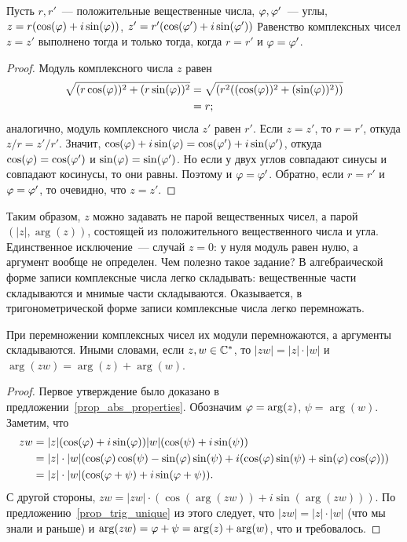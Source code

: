\begin{proposition}\label{prop_trig_unique}
Пусть $r,r'$~--- положительные вещественные числа, $\varphi,\varphi'$~---
углы, $z=r(\cos(\varphi)+i\sin(\varphi))$, $z'=r'(\cos(\varphi')+i\sin(\varphi'))$
Равенство комплексных чисел
$z=z'$ выполнено тогда и
только тогда, когда $r=r'$ и $\varphi=\varphi'$.
\end{proposition}
\begin{proof}
Модуль комплексного числа $z$ равен
\begin{align*}
\sqrt{(r\cos(\varphi))^2+(r\sin(\varphi))^2}&=\sqrt{(r^2((\cos(\varphi))^2+(\sin(\varphi))^2))}\\
&=r;
\end{align*}
аналогично, модуль комплексного числа $z'$ равен $r'$. Если $z=z'$, то
$r=r'$, откуда $z/r=z'/r'$. Значит,
$\cos(\varphi)+i\sin(\varphi)=\cos(\varphi')+i\sin(\varphi')$, откуда
$\cos(\varphi)=\cos(\varphi')$ и $\sin(\varphi)=\sin(\varphi')$. Но если у двух углов
совпадают синусы и совпадают косинусы, то они равны. Поэтому и
$\varphi=\varphi'$.
Обратно, если $r=r'$ и $\varphi=\varphi'$, то очевидно, что $z=z'$.
\end{proof}

\begin{remark}
Таким образом, $z$ можно задавать не парой вещественных чисел, а парой
$(|z|,\arg(z))$, состоящей из положительного вещественного числа и
угла. Единственное исключение~--- случай $z=0$: у нуля модуль равен
нулю, а аргумент вообще не определен. Чем полезно такое задание? В
алгебраической форме записи комплексные числа легко складывать:
вещественные части складываются и мнимые части
складываются. Оказывается, в тригонометрической форме записи
комплексные числа легко перемножать.
\end{remark}

\begin{theorem}\label{thm_complex_mult}
При перемножении комплексных чисел их модули перемножаются, а
аргументы складываются. Иными словами, если $z,w\in\mathbb C^*$, то
$|zw|=|z|\cdot |w|$ и $\arg(zw)=\arg(z)+\arg(w)$.
\end{theorem}
\begin{proof}
Первое утверждение было доказано в
предложении~\ref{prop_abs_properties}. Обозначим $\varphi=\arg(z)$,
$\psi=\arg(w)$. Заметим, что
\begin{align*}
zw&=|z|(\cos(\varphi)+i\sin(\varphi))|w|(\cos(\psi)+i\sin(\psi))\\
&=|z|\cdot |w|(\cos(\varphi)\cos(\psi)-\sin(\varphi)\sin(\psi)+i(\cos(\varphi)\sin(\psi)+\sin(\varphi)\cos(\varphi)))\\
&=|z|\cdot |w|(\cos(\varphi+\psi)+i\sin(\varphi+\psi)).
\end{align*}
С другой стороны, $zw=|zw|\cdot (\cos(\arg(zw))+i\sin(\arg(zw)))$.
По предложению~\ref{prop_trig_unique} из этого следует, что
$|zw|=|z|\cdot |w|$ (что мы знали и раньше) и
$\arg(zw)=\varphi+\psi=\arg(z)+\arg(w)$, что и требовалось.
\end{proof}

